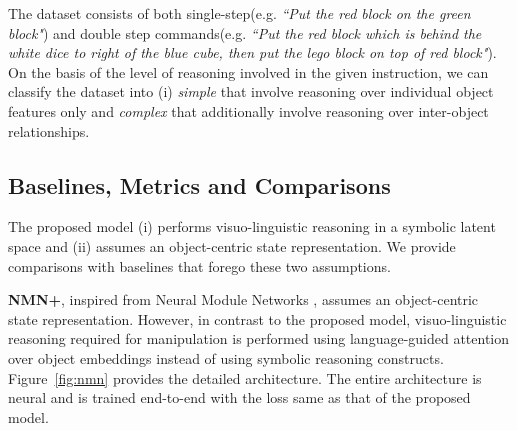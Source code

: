 The dataset consists of both single-step(e.g. \emph{``Put the red block on the green block"}) and double step commands(e.g. \emph{``Put the red block which is behind the white dice to right of the blue cube, then put the lego block on top of red block"}). 
On the basis of the level of reasoning involved in the given instruction, we can classify the dataset into (i) \textit{simple} that involve reasoning over individual object features only and \textit{complex} that additionally involve reasoning over inter-object relationships.

\subsection{Baselines, Metrics and Comparisons} 
The proposed model (i) performs visuo-linguistic reasoning in a symbolic latent space and (ii) assumes an object-centric state representation. We provide comparisons with baselines that forego these two assumptions.


\textbf{NMN+}, inspired from Neural Module Networks \cite{andreas2016neural}, assumes an object-centric state representation. However, in contrast to the proposed model, visuo-linguistic reasoning required for manipulation is performed using language-guided attention over object embeddings instead of using symbolic reasoning constructs. Figure~\ref{fig:nmn} provides the detailed architecture. The entire architecture is neural and is trained end-to-end with the loss same as that of the proposed model. 




